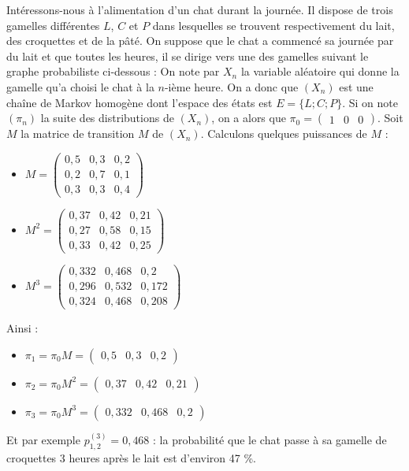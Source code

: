 	\begin{tip}[Exemple]
		Intéressons-nous à l'alimentation d'un chat durant la journée. Il dispose de trois gamelles différentes $L$, $C$ et $P$ dans lesquelles se trouvent respectivement du lait, des croquettes et de la pâté.
		On suppose que le chat a commencé sa journée par du lait et que toutes les heures, il se dirige vers une des gamelles suivant le graphe probabiliste ci-dessous :
		On note par $X_n$ la variable aléatoire qui donne la gamelle qu'a choisi le chat à la $n$-ième heure. On a donc que $(X_n)$ est une chaîne de Markov homogène dont l'espace des états est $E = \{L; C; P\}$. Si on note $(\pi_n)$ la suite des distributions de $(X_n)$, on a alors que $\pi_0 = \begin{pmatrix} 1 & 0 & 0 \end{pmatrix}$.
		\newpar
		Soit $M$ la matrice de transition $M$ de $(X_n)$. Calculons quelques puissances de $M$ :
		\begin{itemize}
			\item $\displaystyle{M = \begin{pmatrix} 0,5 & 0,3 & 0,2 \\ 0,2 & 0,7 & 0,1 \\ 0,3 & 0,3 & 0,4 \end{pmatrix}}$
			\item $\displaystyle{M^2 = \begin{pmatrix} 0,37 & 0,42 & 0,21 \\ 0,27 & 0,58 & 0,15 \\ 0,33 & 0,42 & 0,25 \end{pmatrix}}$
			\item $\displaystyle{M^3 = \begin{pmatrix} 0,332 & 0,468 & 0,2 \\ 0,296 & 0,532 & 0,172 \\ 0,324 & 0,468 & 0,208 \end{pmatrix}}$
		\end{itemize}
		Ainsi :
		\begin{itemize}
			\item $\pi_1 = \pi_0 M = \begin{pmatrix} 0,5 & 0,3 & 0,2 \end{pmatrix}$
			\item $\pi_2 = \pi_0 M^2 = \begin{pmatrix} 0,37 & 0,42 & 0,21 \end{pmatrix}$
			\item $\pi_3 = \pi_0 M^3 = \begin{pmatrix} 0,332 & 0,468 & 0,2 \end{pmatrix}$
		\end{itemize}
		Et par exemple $p_{1,2}^{(3)} = 0,468$ : la probabilité que le chat passe à sa gamelle de croquettes 3 heures après le lait est d'environ 47 \%.
	\end{tip}
	

